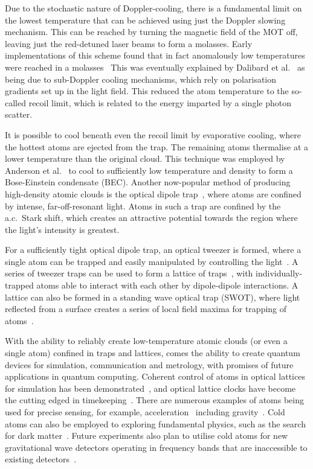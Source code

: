 Due to the stochastic nature of Doppler-cooling, there is a fundamental limit
on the lowest temperature that can be achieved using just the Doppler slowing
mechanism. This can be reached by turning the magnetic field of the MOT off,
leaving just the red-detuned laser beams to form a molasses. Early
implementations of this scheme found that in fact anomalously low temperatures
were reached in a molasses~\cite{Lett1988} This was eventually explained by
Dalibard et al.~\cite{Dalibard:89} as being due to sub-Doppler cooling
mechanisms, which rely on polarisation gradients set up in the light field.
This reduced the atom temperature to the so-called recoil limit, which is
related to the energy imparted by a single photon scatter.

It is possible to cool beneath even the recoil limit by evaporative cooling,
where the hottest atoms are ejected from the trap. The remaining atoms
thermalise at a lower temperature than the original cloud. This technique was
employed by Anderson et al.~\cite{Anderson198} to cool \esRb{} to sufficiently
low temperature and density to form a Bose-Einstein condensate (BEC). Another
now-popular method of producing high-density atomic clouds is the optical
dipole trap~\cite{Chu1986}, where atoms are confined by intense,
far-off-resonant light. Atoms in such a trap are confined by the a.c.\ Stark
shift, which creates an attractive potential towards the region where the
light's intensity is greatest.

For a sufficiently tight optical dipole trap, an optical tweezer is formed,
where a single atom can be trapped and easily manipulated by controlling the
light~\cite{Schlosser2001}. A series of tweezer traps can be used to form a
lattice of traps~\cite{Schlosser2001}, with individually-trapped atoms able to
interact with each other by dipole-dipole interactions. A lattice can also be
formed in a standing wave optical trap (SWOT), where light reflected from a
surface creates a series of local field maxima for trapping of
atoms~\cite{Wu2017}.

With the ability to reliably create low-temperature atomic clouds (or even a
single atom) confined in traps and lattices, comes the ability to create
quantum devices for simulation, communication and metrology, with promises of
future applications in quantum computing. Coherent control of atoms in optical
lattices for simulation has been demonstrated~\cite{Schafer2020}, and optical
lattice clocks have become the cutting edged in
timekeeping~\cite{PhysRevX.8.021036}. There are numerous examples of atoms
being used for precise sensing, for example, acceleration~\cite{Chen2019}
including gravity~\cite{Stray2022}. Cold atoms can also be employed to
exploring fundamental physics, such as the search for dark
matter~\cite{Wcislo2018}. Future experiments also plan to utilise cold atoms
for new gravitational wave detectors operating in frequency bands that are
inaccessible to existing detectors~\cite{}.

